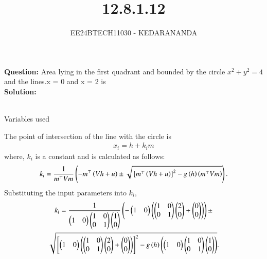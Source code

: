 \documentclass[journal]{IEEEtran}
\begin{document}

\vspace{3cm}

\title{12.8.1.12}
\author{EE24BTECH11030 - KEDARANANDA}
{\let\newpage\relax\maketitle}

\renewcommand{\thefigure}{\theenumi}
\renewcommand{\thetable}{\theenumi}
\setlength{\intextsep}{10pt} %

\textbf{Question:}
 Area lying in the first quadrant and bounded by the circle $x^{2} + y^{2} = 4$ and the lines.x = 0 and x = 2 is\\

\textbf{Solution:}\\\\
\begin{table}[H]
    \centering
    
    \caption{Variables used}
\end{table} 
The point of intersection of the line with the circle is 
\begin{align}
    x_i = h + k_i m
\end{align}
where, $k_i$ is a constant and is calculated as follows:\\
\begin{align}
k_i = \frac{1}{m^\top Vm} \left(-m^\top \left(Vh + u\right) \pm \sqrt{{}\left[m^\top \left(Vh + u\right)\right]^2 - g\left(h\right)\left(m^\top Vm\right)}\right).
\end{align}
Substituting the input parameters into $k_i$,\\

\begin{multline}
k_i = \frac{1}{\begin{pmatrix}1 & 0\end{pmatrix} \begin{pmatrix}1 & 0 \\ 0 & 1\end{pmatrix} \begin{pmatrix}1 \\ 0\end{pmatrix}}
\left(-\begin{pmatrix}1 & 0\end{pmatrix} \left(\begin{pmatrix}1 & 0 \\ 0 & 1\end{pmatrix} \begin{pmatrix}2 \\ 0\end{pmatrix} + \begin{pmatrix}0 \\ 0\end{pmatrix}\right)\right) \pm \\
\sqrt{{}\left[\begin{pmatrix}1 & 0\end{pmatrix} \left(\begin{pmatrix}1 & 0 \\ 0 & 1\end{pmatrix} \begin{pmatrix}2 \\ 0\end{pmatrix} + \begin{pmatrix}0 \\ 0\end{pmatrix}\right)\right]^2 - g\left(h\right)\left(\begin{pmatrix}1 & 0\end{pmatrix} \begin{pmatrix}1 & 0 \\ 0 & 1\end{pmatrix} \begin{pmatrix}1 \\ 0\end{pmatrix}\right)}.
\end{multline}
\end{document}
